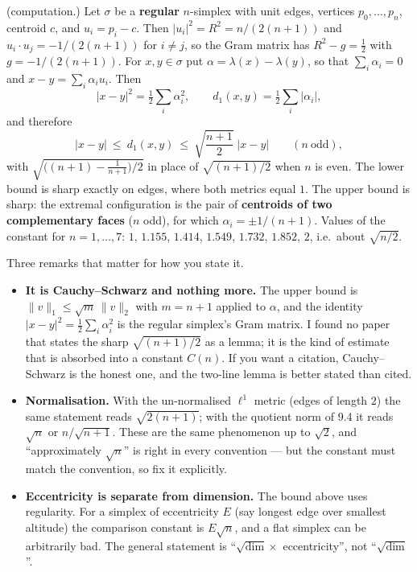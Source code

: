 \documentclass[
]{article}
\providecommand{\tightlist}{%
  \setlength{\itemsep}{0pt}\setlength{\parskip}{0pt}}
\begin{document}
(computation.) Let \(\sigma\) be a \textbf{regular} \(n\)-simplex with
unit edges, vertices \(p_0,\dots,p_n\), centroid \(c\), and
\(u_i=p_i-c\). Then \(\lvert u_i\rvert^2=R^2=n/(2(n+1))\) and
\(u_i\cdot u_j=-1/(2(n+1))\) for \(i\ne j\), so the Gram matrix has
\(R^2-g=\tfrac12\) with \(g=-1/(2(n+1))\). For \(x,y\in\sigma\) put
\(\alpha=\lambda(x)-\lambda(y)\), so that \(\sum_i\alpha_i=0\) and
\(x-y=\sum_i\alpha_i u_i\). Then \[
\lvert x-y\rvert^2=\tfrac12\sum_i\alpha_i^2,\qquad d_1(x,y)=\tfrac12\sum_i\lvert\alpha_i\rvert,
\] and therefore \[
\lvert x-y\rvert\ \le\ d_1(x,y)\ \le\ \sqrt{\frac{n+1}{2}}\;\lvert x-y\rvert\qquad (n\ \text{odd}),
\] with \(\sqrt{\bigl((n+1)-\frac{1}{n+1}\bigr)/2}\) in place of
\(\sqrt{(n+1)/2}\) when \(n\) is even. The lower bound is sharp exactly
on edges, where both metrics equal \(1\). The upper bound is sharp: the
extremal configuration is the pair of \textbf{centroids of two
complementary faces} (\(n\) odd), for which \(\alpha_i=\pm1/(n+1)\).
Values of the constant for \(n=1,\dots,7\): \(1\), \(1.155\), \(1.414\),
\(1.549\), \(1.732\), \(1.852\), \(2\), i.e.~about \(\sqrt{n/2}\).

Three remarks that matter for how you state it.

\begin{itemize}
\tightlist
\item
  \textbf{It is Cauchy--Schwarz and nothing more.} The upper bound is
  \(\lVert v\rVert_1\le\sqrt m\,\lVert v\rVert_2\) with \(m=n+1\)
  applied to \(\alpha\), and the identity
  \(\lvert x-y\rvert^2=\tfrac12\sum_i\alpha_i^2\) is the regular
  simplex's Gram matrix. I found no paper that states the sharp
  \(\sqrt{(n+1)/2}\) as a lemma; it is the kind of estimate that is
  absorbed into a constant \(C(n)\). If you want a citation,
  Cauchy--Schwarz is the honest one, and the two-line lemma is better
  stated than cited.
\item
  \textbf{Normalisation.} With the un-normalised \(\ell^1\) metric
  (edges of length \(2\)) the same statement reads \(\sqrt{2(n+1)}\);
  with the quotient norm of 9.4 it reads \(\sqrt n\) or
  \(n/\sqrt{n+1}\). These are the same phenomenon up to \(\sqrt2\), and
  ``approximately \(\sqrt n\)'' is right in every convention --- but the
  constant must match the convention, so fix it explicitly.
\item
  \textbf{Eccentricity is separate from dimension.} The bound above uses
  regularity. For a simplex of eccentricity \(E\) (say longest edge over
  smallest altitude) the comparison constant is \(E\sqrt n\), and a flat
  simplex can be arbitrarily bad. The general statement is
  ``\(\sqrt{\dim}\times\) eccentricity'', not ``\(\sqrt{\dim}\)''.
\end{itemize}
\end{document}
